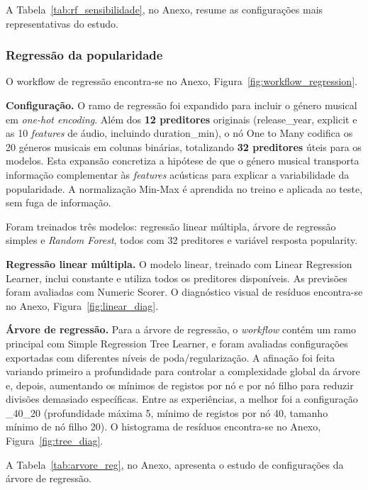 \documentclass[11pt,a4paper]{article}
\newcommand{\code}[1]{{\ttfamily\hyphenchar\font=45\relax #1}}
\begin{document}
A Tabela~\ref{tab:rf_sensibilidade}, no Anexo, resume as configurações mais representativas do estudo.

\subsubsection{Regressão da popularidade}

O workflow de regressão encontra-se no Anexo, Figura~\ref{fig:workflow_regression}.

\textbf{Configuração.}
O ramo de regressão foi expandido para incluir o género musical em \textit{one-hot encoding}. Além dos \textbf{12 preditores} originais (\code{release\_year}, \code{explicit} e as 10 \textit{features} de áudio, incluindo \code{duration\_min}), o nó \code{One to Many} codifica os 20 géneros musicais em colunas binárias, totalizando \textbf{32 preditores} úteis para os modelos. Esta expansão concretiza a hipótese de que o género musical transporta informação complementar às \textit{features} acústicas para explicar a variabilidade da popularidade. A normalização Min-Max é aprendida no treino e aplicada ao teste, sem fuga de informação.

Foram treinados três modelos: regressão linear múltipla, árvore de regressão simples e \textit{Random Forest}, todos com 32 preditores e variável resposta \code{popularity}.

\textbf{Regressão linear múltipla.}
O modelo linear, treinado com \code{Linear Regression Learner}, inclui constante e utiliza todos os preditores disponíveis. As previsões foram avaliadas com \code{Numeric Scorer}. O diagnóstico visual de resíduos encontra-se no Anexo, Figura~\ref{fig:linear_diag}.

\textbf{Árvore de regressão.}
Para a árvore de regressão, o \textit{workflow} contém um ramo principal com \code{Simple Regression Tree Learner}, e foram avaliadas configurações exportadas com diferentes níveis de poda/regularização. A afinação foi feita variando primeiro a profundidade para controlar a complexidade global da árvore e, depois, aumentando os mínimos de registos por nó e por nó filho para reduzir divisões demasiado específicas. Entre as experiências, a melhor foi a configuração \code{5\_40\_20} (profundidade máxima 5, mínimo de registos por nó 40, tamanho mínimo de nó filho 20). O histograma de resíduos encontra-se no Anexo, Figura~\ref{fig:tree_diag}.

A Tabela~\ref{tab:arvore_reg}, no Anexo, apresenta o estudo de configurações da árvore de regressão.
\end{document}
